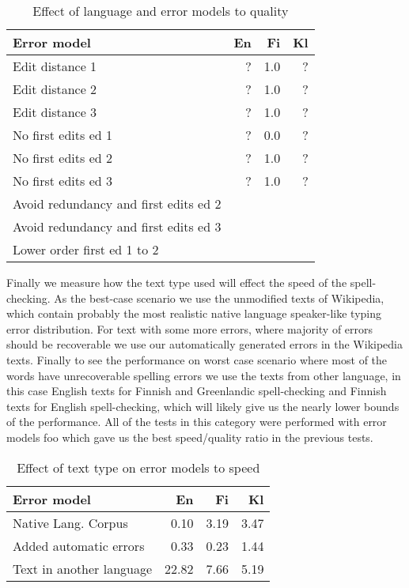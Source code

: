 \documentclass[11pt]{article}
\begin{document}
\begin{table}[h]
\begin{center}
\begin{scriptsize}
\begin{tabular}{|l|rrr|}
\hline
\bf Error model & \bf En & \bf Fi & \bf Kl\\ 
\hline
\hline
Edit distance 1 &
?&1.0&?
\\
Edit distance 2 &
?&1.0&?
\\
Edit distance 3 &
?&1.0&?
\\
No first edits ed 1 & 
?&0.0&?
\\
No first edits ed 2 &
?&1.0&?
\\
No first edits ed 3 &
?&1.0&?
\\
Avoid redundancy and first edits ed 2 &
\\
Avoid redundancy and first edits ed 3 &
\\
Lower order first ed 1 to 2 &
\\
\hline
\end{tabular}
\end{scriptsize}
\end{center}
\caption{\label{table:error-model-vs-language} Effect of language and 
error models to quality}
\end{table}

Finally we measure how the text type used will effect the speed of the
spell-checking. As the best-case scenario we use the unmodified texts of
Wikipedia, which contain probably the most realistic native language
speaker-like typing error distribution. For text with some more errors, where
majority of errors should be recoverable we use our automatically generated
errors in the Wikipedia texts. Finally to see the performance on worst case
scenario where most of the words have unrecoverable spelling errors we use the
texts from other language, in this case English texts for Finnish and 
Greenlandic spell-checking and Finnish texts for English spell-checking, which
will likely give us the nearly lower bounds of the performance. All of the
tests in this category were performed with error models foo which gave us 
the best speed/quality ratio in the previous tests.

\begin{table}[h]
\begin{center}
\begin{scriptsize}
\begin{tabular}{|l|rrr|}
\hline
\bf Error model & \bf En & \bf Fi & \bf Kl  \\ 
\hline
Native Lang. Corpus &
0.10&3.19&3.47
\\
Added automatic errors &
0.33&0.23&1.44
\\
Text in another language &
22.82&7.66&5.19
\\
\hline
\end{tabular}
\end{scriptsize}
\end{center}
\caption{\label{table:language-vs-text-type} Effect of text type on
error models to speed}
\end{table}
\end{document}
